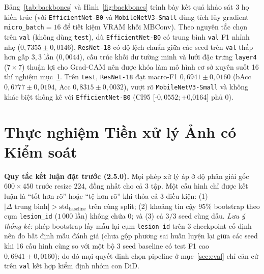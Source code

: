 \documentclass[10pt,twocolumn,a4paper]{article}
\begin{document}
Bảng~\ref{tab:backbones} và Hình~\ref{fig:backbones} trình bày kết quả khảo sát 3 họ kiến trúc (với \texttt{EfficientNet-B0} và \texttt{MobileNetV3-Small} dùng tích lũy gradient \texttt{micro\_batch}$=16$ để tiết kiệm VRAM khối MBConv). Theo nguyên tắc chọn trên \texttt{val} (không dùng \texttt{test}), dù \texttt{EfficientNet-B0} có trung bình \texttt{val} F1 nhỉnh nhẹ ($0{,}7355 \pm 0{,}0146$), \texttt{ResNet-18} có độ lệch chuẩn giữa các seed trên \texttt{val} thấp hơn gấp $3{,}3$ lần ($0{,}0044$), cấu trúc khối dư tường minh và lưới đặc trưng \texttt{layer4} ($7{\times}7$) thuận lợi cho Grad-CAM nên được khóa làm mô hình cơ sở xuyên suốt 16 thí nghiệm mục~\ref{sec:ablation}. Trên \texttt{test}, \texttt{ResNet-18} đạt macro-F1 $0{,}6941 \pm 0{,}0160$ (bAcc $0{,}6777 \pm 0{,}0194$, Acc $0{,}8315 \pm 0{,}0032$), vượt rõ \texttt{MobileNetV3-Small} và không khác biệt thống kê với \texttt{EfficientNet-B0} (CI95 $[$-$0{,}0552; $+0{,}0164$]$ phủ $0$).

\section{Thực nghiệm Tiền xử lý Ảnh có Kiểm soát}
\label{sec:ablation}
\textbf{Quy tắc kết luận đặt trước (2.5.0).} Mọi phép xử lý áp ở độ phân giải gốc $600{\times}450$ trước resize $224$, đồng nhất cho cả 3 tập. Một cấu hình chỉ được kết luận là ``tốt hơn rõ'' hoặc ``tệ hơn rõ'' khi thỏa cả 3 điều kiện: (1) $|\Delta\text{ trung bình}| > \text{std}_{\text{baseline}}$ trên cùng split; (2) khoảng tin cậy $95\%$ bootstrap theo cụm \texttt{lesion\_id} ($1\,000$ lần) không chứa $0$; và (3) cả $3/3$ seed cùng dấu. \emph{Lưu ý thống kê:} phép bootstrap lấy mẫu lại cụm \texttt{lesion\_id} trên 3 checkpoint cố định nên đo bất định mẫu đánh giá (chưa gộp phương sai huấn luyện lại giữa các seed khi 16 cấu hình cùng so với một bộ 3 seed baseline có test F1 cao $0{,}6941 \pm 0{,}0160$); do đó mọi quyết định chọn pipeline ở mục~\ref{sec:eval} chỉ căn cứ trên \texttt{val} kết hợp kiểm định nhóm con DiD.
\end{document}
